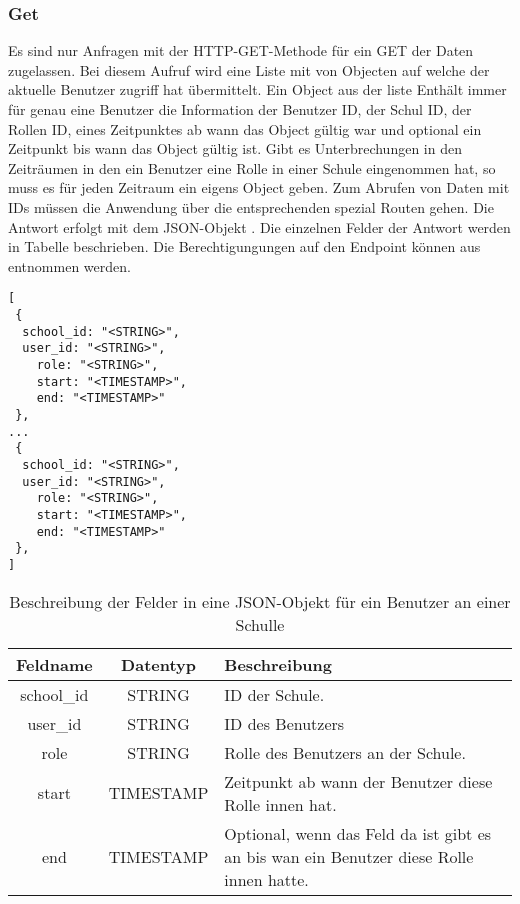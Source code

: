 \subsubsection{Get}
\label{sec:end:rest:api:school:users:get}
Es sind nur Anfragen mit der HTTP-GET-Methode für ein GET der Daten zugelassen.
Bei diesem Aufruf wird eine Liste mit von Objecten auf welche der aktuelle Benutzer zugriff hat übermittelt.
Ein Object aus der liste Enthält immer für genau eine Benutzer die Information der Benutzer ID, der Schul ID, der Rollen ID, eines Zeitpunktes ab wann das Object gültig war und optional ein Zeitpunkt bis wann das Object gültig ist.
Gibt es Unterbrechungen in den Zeiträumen in den ein Benutzer eine Rolle in einer Schule eingenommen hat, so muss es für jeden Zeitraum ein eigens Object geben.
Zum Abrufen von Daten mit IDs müssen die Anwendung über die entsprechenden spezial Routen gehen.
Die Antwort erfolgt mit dem JSON-Objekt . Die einzelnen Felder der Antwort werden in Tabelle  beschrieben.
Die Berechtigungungen auf den Endpoint können aus  entnommen werden.


\begin{lstlisting}[caption={JSON-Antwort für einen GET-Aufruf der Route /api/school/users},label={lst:code:end:rest:api:school:users:get:ret},frame=tlrb]
[
 {
  school_id: "<STRING>",
  user_id: "<STRING>",
	role: "<STRING>",
	start: "<TIMESTAMP>",
	end: "<TIMESTAMP>"
 },
...
 {
  school_id: "<STRING>",
  user_id: "<STRING>",
	role: "<STRING>",
	start: "<TIMESTAMP>",
	end: "<TIMESTAMP>"
 },
]
\end{lstlisting}

\begin{table}[htb]
	\begin{tabularx}{\textwidth}{|c|c|X|}
		\hline
			\textbf{Feldname} & \textbf{Datentyp} & \textbf{Beschreibung} \\ \hline
			school\_id & STRING & ID der Schule. \\ \hline
			user\_id & STRING & ID des Benutzers \\ \hline
			role & STRING & Rolle des Benutzers an der Schule. \\ \hline
			start & TIMESTAMP & Zeitpunkt ab wann der Benutzer diese Rolle innen hat. \\ \hline
			end & TIMESTAMP & Optional, wenn das Feld da ist gibt es an bis wan ein Benutzer diese Rolle innen hatte. \\ \hline
	\end{tabularx}

		\caption{Beschreibung der Felder in eine JSON-Objekt für ein Benutzer an einer Schulle}
		\label{tab:end:rest:api:school:users:get:ret:json}
\end{table}

